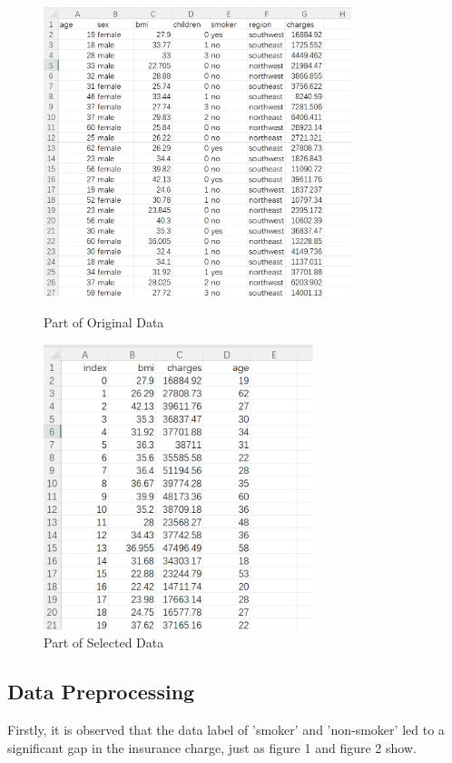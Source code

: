 \documentclass[12pt,a4paper]{article}
\begin{document}
\begin{figure}[H]
\begin{minipage}[t]{0.48\textwidth}
\centering
\includegraphics[width = 0.8\textwidth]{original_data.png}
\caption{Part of Original Data}
\end{minipage}
\begin{minipage}[t]{0.48\textwidth}
\centering
\includegraphics[width = 0.7\textwidth]{selected_data.png}
\caption{Part of Selected Data}
\end{minipage}
\end{figure}
 
\subsection{Data Preprocessing}
Firstly, it is observed that the data label of 'smoker' and 'non-smoker' led to a significant gap in the insurance charge, just as figure 1 and figure 2 show. 
\end{document}
